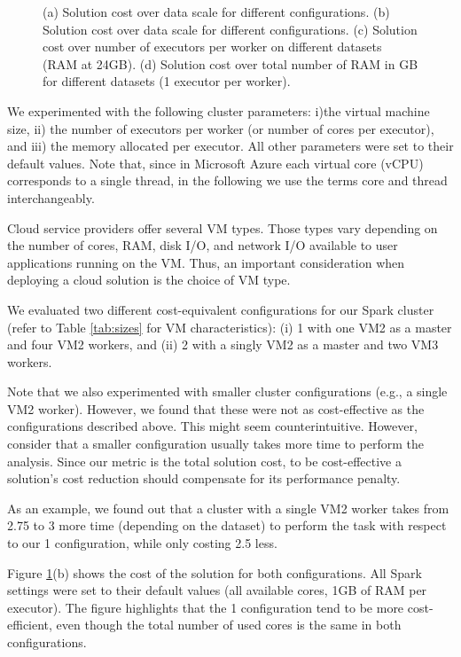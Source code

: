 {\begin{figure}[t!]
{  }
\caption{(a) Solution cost over data scale for different \sti{} configurations. (b) Solution cost over data scale for different \sparkdi{} configurations. (c) Solution cost over number of executors per worker on different datasets (RAM at 24GB). (d) Solution cost over total number of RAM in GB for different datasets (1 executor per worker).}
\label{fig:tuning}
\end{figure}

We experimented with the following cluster parameters: i)the virtual machine size, ii) the number of executors per worker (or number of cores per executor), and iii) the memory allocated per executor.
All other parameters were set to their default values. Note that, since in Microsoft Azure each virtual core (vCPU) corresponds to a single thread, in the following we use the terms core and thread interchangeably.

Cloud service providers offer several VM types. Those types vary depending on the number of cores, RAM, disk I/O, and network I/O available to user applications running on the VM. Thus, an important consideration when deploying a cloud solution is the choice of VM type.

We evaluated two different cost-equivalent configurations for our Spark cluster (refer to Table \ref{tab:sizes} for VM characteristics): (i) \sparkdi{}1 with one VM2 as a master and four VM2 workers, and (ii) \sparkdi{}2 with a singly VM2 as a master and two VM3 workers.

Note that we also experimented with smaller cluster configurations (e.g., a single VM2 worker). However, we found that these were not as cost-effective as the configurations described above. This might seem counterintuitive. However, consider that a smaller configuration usually takes more time to perform the analysis. Since our metric is the total solution cost, to be cost-effective a solution's cost reduction should compensate for its performance penalty.

As an example, we found out that a cluster with a single VM2 worker takes from 2.75 to 3 more time (depending on the dataset) to perform the task with respect to our \sparkdi{}1 configuration, while only costing 2.5 less.

Figure \ref{fig:tuning}(b) shows the cost of the solution for both configurations. All Spark settings were set to their default values (all available cores, 1GB of RAM per executor). The figure highlights that the \sparkdi{}1 configuration tend to be more cost-efficient, even though the total number of used cores is the same in both configurations.

}
